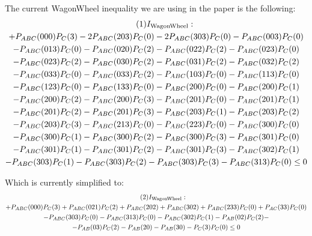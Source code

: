 \documentclass[aps, 10pt, english, twoside, pra, nofootinbib, tightenlines, longbibliography, superscriptaddress]{revtex4-1}
\begin{document}
    The current WagonWheel inequality we are using in the paper is the following:
    \begin{equation*}
    \begin{gathered}
        \eq
        I\tsb{WagonWheel} : \\
        + P_{ABC}(000)P_{C}(3) - 2P_{ABC}(203)P_{C}(0) - 2P_{ABC}(303)P_{C}(0) - P_{ABC}(003)P_{C}(0) \\
        - P_{ABC}(013)P_{C}(0) - P_{ABC}(020)P_{C}(2) - P_{ABC}(022)P_{C}(2) - P_{ABC}(023)P_{C}(0) \\
        - P_{ABC}(023)P_{C}(2) - P_{ABC}(030)P_{C}(2) - P_{ABC}(031)P_{C}(2) - P_{ABC}(032)P_{C}(2) \\
        - P_{ABC}(033)P_{C}(0) - P_{ABC}(033)P_{C}(2) - P_{ABC}(103)P_{C}(0) - P_{ABC}(113)P_{C}(0) \\
        - P_{ABC}(123)P_{C}(0) - P_{ABC}(133)P_{C}(0) - P_{ABC}(200)P_{C}(0) - P_{ABC}(200)P_{C}(1) \\
        - P_{ABC}(200)P_{C}(2) - P_{ABC}(200)P_{C}(3) - P_{ABC}(201)P_{C}(0) - P_{ABC}(201)P_{C}(1) \\
        - P_{ABC}(201)P_{C}(2) - P_{ABC}(201)P_{C}(3) - P_{ABC}(203)P_{C}(1) - P_{ABC}(203)P_{C}(2) \\
        - P_{ABC}(203)P_{C}(3) - P_{ABC}(213)P_{C}(0) - P_{ABC}(223)P_{C}(0) - P_{ABC}(300)P_{C}(0) \\
        - P_{ABC}(300)P_{C}(1) - P_{ABC}(300)P_{C}(2) - P_{ABC}(300)P_{C}(3) - P_{ABC}(301)P_{C}(0) \\
        - P_{ABC}(301)P_{C}(1) - P_{ABC}(301)P_{C}(2) - P_{ABC}(301)P_{C}(3) - P_{ABC}(302)P_{C}(1) \\
        - P_{ABC}(303)P_{C}(1) - P_{ABC}(303)P_{C}(2) - P_{ABC}(303)P_{C}(3) - P_{ABC}(313)P_{C}(0) \leq 0
    \end{gathered}
    \end{equation*}

    Which is currently simplified to:
    \begin{equation*}
    \begin{gathered}
    \eq
    I\tsb{WagonWheel} : \\
    + P_{ABC}(000)P_{C}(3) + P_{ABC}(021)P_{C}(2) + P_{ABC}(202) + P_{ABC}(302) + P_{ABC}(233)P_{C}(0) + P_{AC}(33)P_{C}(0) \\
    - P_{ABC}(303)P_{C}(0) - P_{ABC}(313)P_{C}(0) - P_{ABC}(302)P_{C}(1) - P_{AB}(02)P_{C}(2) - \\
    - P_{AB}(03)P_{C}(2) - P_{AB}(20) - P_{AB}(30) - P_{C}(3)P_{C}(0) \leq 0
    \end{gathered}
    \end{equation*}
\end{document}
